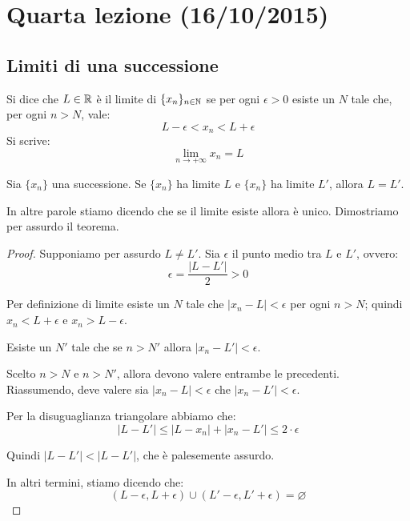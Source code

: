 \chapter{Quarta lezione (16/10/2015)}

\section{Limiti di una successione}

\begin{definition}
Si dice che $L \in \mathbb R$ è il limite di $\{x_n\}_{n \in \mathbb N}$ se per ogni $\epsilon > 0$ esiste un $N$ tale che, per ogni $n > N$, vale:
\begin{equation*}
L - \epsilon < x_n < L + \epsilon
\end{equation*}
Si scrive:
\begin{equation*}
\lim_{n \to +\infty} x_n = L
\end{equation*}
\end{definition}

\begin{theorem}
Sia $\{x_n\}$ una successione. Se $\{x_n\}$ ha limite $L$ e $\{x_n\}$ ha limite $L'$, allora $L = L'$.
\end{theorem}

In altre parole stiamo dicendo che se il limite esiste allora è unico. Dimostriamo per assurdo il teorema.

\begin{proof}
Supponiamo per assurdo $L \neq L'$. Sia $\epsilon$ il punto medio tra $L$ e $L'$, ovvero:
\begin{equation*}
\epsilon = \frac{|L - L'|}{2} > 0
\end{equation*}

Per definizione di limite esiste un $N$ tale che $|x_n - L| < \epsilon$ per ogni $n > N$; quindi $x_n < L + \epsilon$ e $x_n > L - \epsilon$.

Esiste un $N'$ tale che se $n > N'$ allora $|x_n - L'| < \epsilon$.

Scelto $n > N$ e $n > N'$, allora devono valere entrambe le precedenti. Riassumendo, deve valere sia $|x_n - L| < \epsilon$ che $|x_n - L'| < \epsilon$.

Per la disuguaglianza triangolare abbiamo che:
\begin{equation*}
|L - L'| \le |L - x_n| + |x_n - L'| \le 2\cdot\epsilon
\end{equation*}

Quindi $|L - L'| < |L - L'|$, che è palesemente assurdo.

In altri termini, stiamo dicendo che:
\begin{equation*}
(L - \epsilon, L + \epsilon) \cup (L' - \epsilon, L' + \epsilon) = \varnothing
\end{equation*}
\end{proof}

